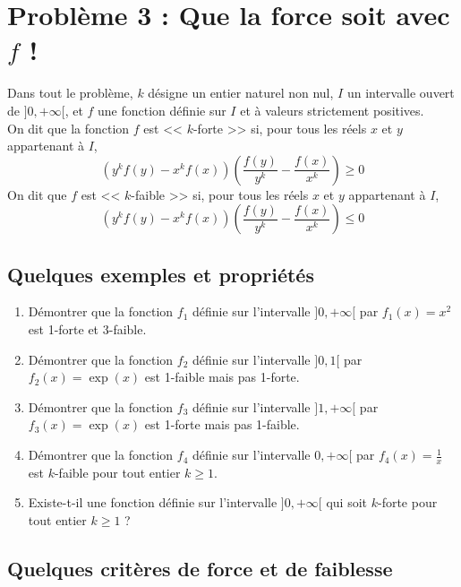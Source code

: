 \documentclass[landscape,twocolumn,leqno,a4paper,10pt]{report} %
\newcommand\n{\noindent}
\renewcommand{\geq}{\geqslant}
\renewcommand{\leq}{\leqslant}
\begin{document}
\section{Problème 3 : Que la force soit avec $f$ !}

\n Dans tout le problème, $k$ désigne un entier naturel non nul, $I$ un intervalle ouvert de $] 0,+\infty[$, et $f$ une fonction définie sur $I$ et à valeurs strictement positives.\\
On dit que la fonction $f$ est << $k$-forte >> si, pour tous les réels $x$ et $y$ appartenant à $I$,
$$\left(y^{k} f(y)-x^{k} f(x)\right)\left(\frac{f(y)}{y^{k}}-\frac{f(x)}{x^{k}}\right) \geq 0$$
On dit que $f$ est << $k$-faible >> si, pour tous les réels $x$ et $y$ appartenant à $I$,
$$\left(y^{k} f(y)-x^{k} f(x)\right)\left(\frac{f(y)}{y^{k}}-\frac{f(x)}{x^{k}}\right) \leq 0$$

\subsection{Quelques exemples et propriétés}

\begin{enumerate}
	\item Démontrer que la fonction $f_{1}$ définie sur l'intervalle $]0,+\infty[$ par $f_{1}(x)=x^{2}$ est 1-forte et 3-faible.
	\item Démontrer que la fonction $f_{2}$ définie sur l'intervalle $]0,1[$ par $f_{2}(x)=\exp(x)$ est 1-faible mais pas 1-forte.
	\item Démontrer que la fonction $f_{3}$ définie sur l'intervalle $]1,+\infty[$ par $f_{3}(x)=\exp(x)$ est 1-forte mais pas 1-faible.
	\item Démontrer que la fonction $f_{4}$ définie sur l'intervalle $ 0,+\infty[$ par $f_{4}(x)=\frac{1}{x}$ est $k$-faible pour tout entier $k \geq 1$.
	\item Existe-t-il une fonction définie sur l'intervalle $]0,+\infty[$ qui soit $k$-forte pour tout entier $k \geq 1$ ?
\end{enumerate}

\subsection{Quelques critères de force et de faiblesse}
\end{document}
